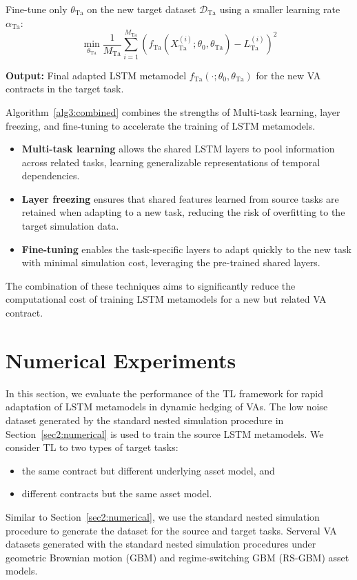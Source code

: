 \begin{algorithm}
\begin{algorithmic}[1]
        \STATE Fine-tune only $\theta_{\text{Ta}}$ on the new target dataset $\mathcal{D}_{\text{Ta}}$ using a smaller learning rate $\alpha_{\text{Ta}}$:
        \begin{equation}
            \min_{\theta_{\text{Ta}}} \frac{1}{M_{\text{Ta}}} \sum_{i=1}^{M_{\text{Ta}}} \left( f_{\text{Ta}}(X_{\text{Ta}}^{(i)}; \theta_0, \theta_{\text{Ta}}) - L_{\text{Ta}}^{(i)} \right)^2
        \end{equation}
        
        \STATE \textbf{Output:} Final adapted LSTM metamodel $f_{\text{Ta}}(\cdot; \theta_0, \theta_{\text{Ta}})$ for the new VA contracts in the target task.
    \end{algorithmic}
    \end{algorithm}

Algorithm~\ref{alg3:combined} combines the strengths of Multi-task learning, layer freezing, and fine-tuning to accelerate the training of LSTM metamodels. 

\begin{itemize}
    \item \textbf{Multi-task learning} allows the shared LSTM layers to pool information across related tasks, learning generalizable representations of temporal dependencies.
    \item \textbf{Layer freezing} ensures that shared features learned from source tasks are retained when adapting to a new task, reducing the risk of overfitting to the target simulation data.
    \item \textbf{Fine-tuning} enables the task-specific layers to adapt quickly to the new task with minimal simulation cost, leveraging the pre-trained shared layers.
\end{itemize}
    
The combination of these techniques aims to significantly reduce the computational cost of training LSTM metamodels for a new but related VA contract.

\section{Numerical Experiments} \label{sec3:experiments}

In this section, we evaluate the performance of the TL framework for rapid adaptation of LSTM metamodels in dynamic hedging of VAs.
The low noise dataset generated by the standard nested simulation procedure in Section~\ref{sec2:numerical} is used to train the source LSTM metamodels.
We consider TL to two types of target tasks: 
\begin{itemize}
    \item the same contract but different underlying asset model, and
    \item different contracts but the same asset model.
\end{itemize}  
Similar to Section~\ref{sec2:numerical}, we use the standard nested simulation procedure to generate the dataset for the source and target tasks.
Serveral VA datasets generated with the standard nested simulation procedures under geometric Brownian motion (GBM) and regime-switching GBM (RS-GBM) asset models.

